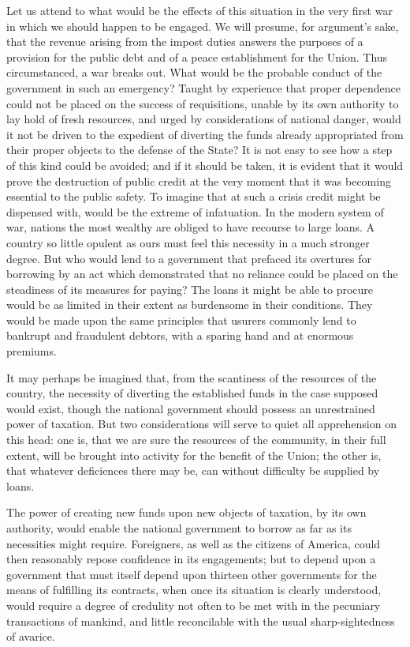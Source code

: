 Let us attend to what would be the effects of this situation in the very first war in which we should happen to be engaged. We will presume, for argument's sake, that the revenue arising from the impost duties answers the purposes of a provision for the public debt and of a peace establishment for the Union. Thus circumstanced, a war breaks out. What would be the probable conduct of the government in such an emergency? Taught by experience that proper dependence could not be placed on the success of requisitions, unable by its own authority to lay hold of fresh resources, and urged by considerations of national danger, would it not be driven to the expedient of diverting the funds already appropriated from their proper objects to the defense of the State? It is not easy to see how a step of this kind could be avoided; and if it should be taken, it is evident that it would prove the destruction of public credit at the very moment that it was becoming essential to the public safety. To imagine that at such a crisis credit might be dispensed with, would be the extreme of infatuation. In the modern system of war, nations the most wealthy are obliged to have recourse to large loans. A country so little opulent as ours must feel this necessity in a much stronger degree. But who would lend to a government that prefaced its overtures for borrowing by an act which demonstrated that no reliance could be placed on the steadiness of its measures for paying? The loans it might be able to procure would be as limited in their extent as burdensome in their conditions. They would be made upon the same principles that usurers commonly lend to bankrupt and fraudulent debtors, with a sparing hand and at enormous premiums.

It may perhaps be imagined that, from the scantiness of the resources of the country, the necessity of diverting the established funds in the case supposed would exist, though the national government should possess an unrestrained power of taxation. But two considerations will serve to quiet all apprehension on this head: one is, that we are sure the resources of the community, in their full extent, will be brought into activity for the benefit of the Union; the other is, that whatever deficiences there may be, can without difficulty be supplied by loans.

The power of creating new funds upon new objects of taxation, by its own authority, would enable the national government to borrow as far as its necessities might require. Foreigners, as well as the citizens of America, could then reasonably repose confidence in its engagements; but to depend upon a government that must itself depend upon thirteen other governments for the means of fulfilling its contracts, when once its situation is clearly understood, would require a degree of credulity not often to be met with in the pecuniary transactions of mankind, and little reconcilable with the usual sharp-sightedness of avarice.

